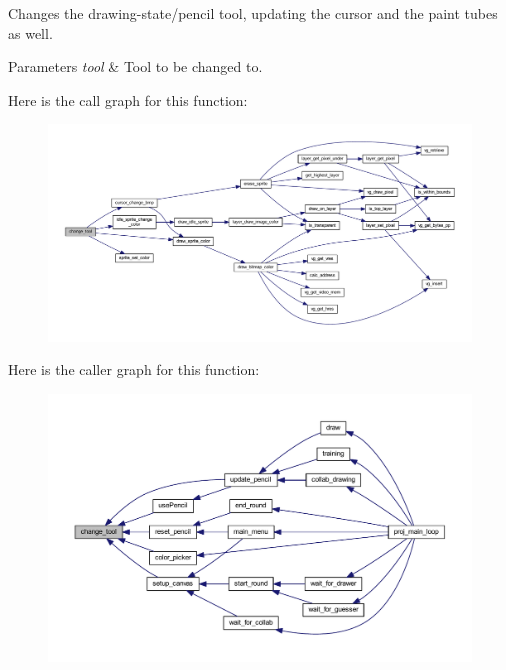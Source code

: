 Changes the drawing-\/state/pencil tool, updating the cursor and the paint tubes as well. 


\begin{DoxyParams}{Parameters}
{\em tool} & Tool to be changed to. \\
\hline
\end{DoxyParams}
Here is the call graph for this function\+:\nopagebreak
\begin{figure}[H]
\begin{center}
\leavevmode
\includegraphics[width=350pt]{group__pengoo_gac36b16b3f3b197d1e93926a0b5ba1396_cgraph}
\end{center}
\end{figure}
Here is the caller graph for this function\+:\nopagebreak
\begin{figure}[H]
\begin{center}
\leavevmode
\includegraphics[width=350pt]{group__pengoo_gac36b16b3f3b197d1e93926a0b5ba1396_icgraph}
\end{center}
\end{figure}
\mbox{\label{group__pengoo_ga771576cc26d893bc389c414f151af27f}} 
